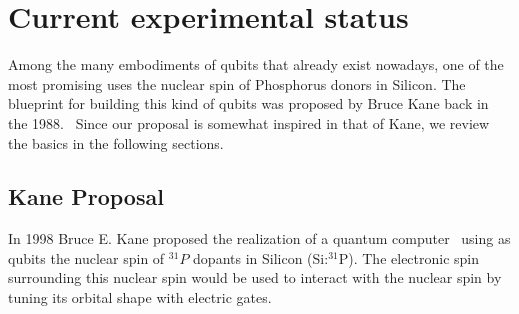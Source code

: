 \chapter{Current experimental status}
Among the many embodiments of qubits that already exist nowadays, one of the most promising uses the nuclear spin of Phosphorus donors in Silicon. The blueprint for building this kind of qubits was proposed by Bruce Kane back in the 1988.~\cite{Kane1988} Since our proposal is somewhat inspired in that of Kane, we review the basics in the following sections.



\section{Kane Proposal}
In 1998 Bruce E. Kane proposed the realization of a quantum computer~\cite{Kane1988} using as qubits the nuclear spin of $^{31}P$ dopants in Silicon (Si:$^{31}$P).
The electronic spin surrounding this nuclear spin would be used to interact with the nuclear spin by tuning its orbital shape with electric gates.

